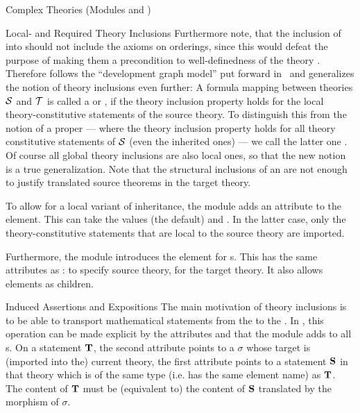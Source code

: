 \begin{tchapter}[id=complex-theories,short=Complex Theories]{Complex Theories (Modules
     and )}
\begin{tsection}[id=restricting-inference,short=Local/Required Theory Inclusions]{Local- and Required Theory Inclusions}
Furthermore note, that the inclusion of  into 
should not include the  axioms on orderings, since this would defeat the
purpose of making them a precondition to well-definedness of the theory
. Therefore \omdoc follows the ``development graph model'' put
forward in~\cite{Hutter:mocsv00} and generalizes the notion of theory inclusions even
further: A formula mapping between theories ${\cal S}$ and ${\cal T}$ is called a
 or , if the theory
inclusion property holds for the local theory-constitutive statements of the source
theory.  To distinguish this from the notion of a proper  ---
where the theory inclusion property holds for all theory constitutive statements of ${\cal S}$
(even the inherited ones) --- we call the latter one . Of course all
global theory inclusions are also local ones, so that the new notion is a true
generalization. Note that the structural inclusions of an  are
not enough to justify translated source theorems in the target theory.

To allow for a local variant of inheritance, the  module adds an
attribute  to the  element. This can take
the values  (the default) and
. In the latter case, only the theory-constitutive
statements that are local to the source theory are imported.
  
Furthermore, the  module introduces the 
element for s. This has the same attributes as
:  to specify source
theory,  for the target theory. It also allows
 elements as children.
\end{tsection}

\begin{tsection}[id=induced-assertions,short=Induced Assertions]{Induced Assertions and Expositions}
  The main motivation of theory inclusions is to be able to transport mathematical
  statements from the  to the . In
  \omdoc, this operation can be made explicit by the attributes
   and  that the module
   adds to all s.  On a statement
  ${\bf T}$, the second attribute points to a  $\sigma$ whose
  target is (imported into the) current theory, the first attribute points to a statement
  ${\bf S}$ in that theory which is of the same type (i.e. has the same \omdoc element name)
  as ${\bf T}$.  The content of ${\bf T}$ must be (equivalent to) the content of ${\bf S}$ translated
  by the morphism of $\sigma$.
  

\end{tsection}
\end{tchapter}
